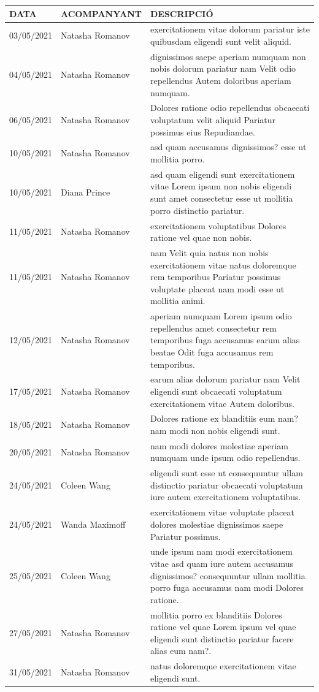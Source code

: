 \documentclass[a4paper,12pt]{elsarticle}  %
\begin{document}
	\begin{longtable}{p{}lp{}}
		

		
		\hline
		\textbf{DATA} & \textbf{ACOMPANYANT} & \textbf{DESCRIPCIÓ}\\
		\hline
			 03/05/2021 & Natasha Romanov & exercitationem vitae dolorum pariatur iste quibusdam eligendi sunt velit aliquid. \\ 
			 04/05/2021 & Natasha Romanov & dignissimos saepe aperiam numquam non nobis dolorum pariatur nam Velit odio repellendus Autem doloribus aperiam numquam. \\ 
			 06/05/2021 & Natasha Romanov & Dolores ratione odio repellendus obcaecati voluptatum velit aliquid Pariatur possimus eius Repudiandae. \\ 
			 10/05/2021 & Natasha Romanov & asd quam accusamus dignissimos? esse ut mollitia porro. \\ 
			 10/05/2021 & Diana Prince & asd quam eligendi sunt exercitationem vitae Lorem ipsum non nobis eligendi sunt amet consectetur esse ut mollitia porro distinctio pariatur. \\ 
			 11/05/2021 & Natasha Romanov & exercitationem voluptatibus Dolores ratione vel quae non nobis. \\ 
			 11/05/2021 & Natasha Romanov & nam Velit quia natus non nobis exercitationem vitae natus doloremque rem temporibus Pariatur possimus voluptate placeat nam modi esse ut mollitia animi. \\ 
			 12/05/2021 & Natasha Romanov & aperiam numquam Lorem ipsum odio repellendus amet consectetur rem temporibus fuga accusamus earum alias beatae Odit fuga accusamus rem temporibus. \\ 
			 17/05/2021 & Natasha Romanov & earum alias dolorum pariatur nam Velit eligendi sunt obcaecati voluptatum exercitationem vitae Autem doloribus. \\ 
			 18/05/2021 & Natasha Romanov & Dolores ratione ex blanditiis eum nam? nam modi non nobis eligendi sunt. \\ 
			 20/05/2021 & Natasha Romanov & nam modi dolores molestiae aperiam numquam unde ipsum odio repellendus. \\ 
			 24/05/2021 & Coleen Wang & eligendi sunt esse ut consequuntur ullam distinctio pariatur obcaecati voluptatum iure autem exercitationem voluptatibus. \\ 
			 24/05/2021 & Wanda Maximoff & exercitationem vitae voluptate placeat dolores molestiae dignissimos saepe Pariatur possimus. \\ 
			 25/05/2021 & Coleen Wang & unde ipsum nam modi exercitationem vitae asd quam iure autem accusamus dignissimos? consequuntur ullam mollitia porro fuga accusamus nam modi Dolores ratione. \\ 
			 27/05/2021 & Natasha Romanov & mollitia porro ex blanditiis Dolores ratione vel quae Lorem ipsum vel quae eligendi sunt distinctio pariatur facere alias eum nam?. \\ 
			 31/05/2021 & Natasha Romanov & natus doloremque exercitationem vitae eligendi sunt. \\ 
		
	\end{longtable}
\end{document}
